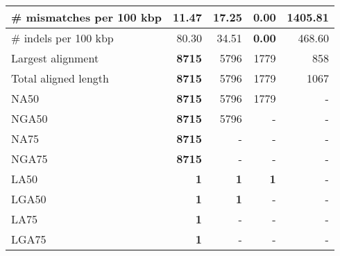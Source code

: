 \documentclass[12pt,a4paper]{article}
\begin{document}
\begin{table}[ht]
\begin{center}
\begin{tabular}{|l*{4}{|r}|}
\# mismatches per 100 kbp & 11.47 & 17.25 & {\bf 0.00} & 1405.81 \\ \hline
\# indels per 100 kbp & 80.30 & 34.51 & {\bf 0.00} & 468.60 \\ \hline
Largest alignment & {\bf 8715} & 5796 & 1779 & 858 \\ \hline
Total aligned length & {\bf 8715} & 5796 & 1779 & 1067 \\ \hline
NA50 & {\bf 8715} & 5796 & 1779 & - \\ \hline
NGA50 & {\bf 8715} & 5796 & - & - \\ \hline
NA75 & {\bf 8715} & - & - & - \\ \hline
NGA75 & {\bf 8715} & - & - & - \\ \hline
LA50 & {\bf 1} & {\bf 1} & {\bf 1} & - \\ \hline
LGA50 & {\bf 1} & {\bf 1} & - & - \\ \hline
LA75 & {\bf 1} & - & - & - \\ \hline
LGA75 & {\bf 1} & - & - & - \\ \hline
\end{tabular}
\end{center}
\end{table}
\end{document}
